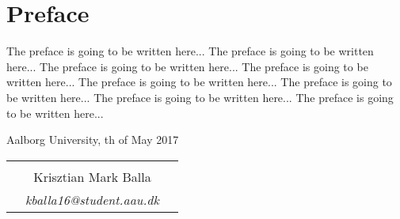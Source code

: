\chapter*{Preface}

The preface is going to be written here... 
The preface is going to be written here... 
The preface is going to be written here... 
The preface is going to be written here... 
The preface is going to be written here... 
The preface is going to be written here... 
The preface is going to be written here... 
The preface is going to be written here... 

\hfill Aalborg University, th of May 2017




\vfill

\begin{table}[H]
	\centering
		\begin{tabular}{c c c}
			& \underline{\phantom{mmmmmmmmmmmmmmmmmmm}} 	& \\
			& Krisztian Mark Balla					& \\
			& \textit{kballa16@student.aau.dk}		& \\
		\end{tabular}
\end{table}